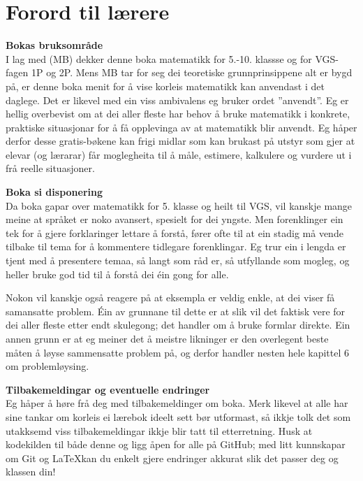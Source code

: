 


\newpage
\section*{Forord til lærere}
\textbf{Bokas bruksområde}\\
I lag med  (MB) dekker denne boka matematikk for 5.-10. klassse og for VGS-fagen 1P og 2P. Mens MB tar for seg dei teoretiske grunnprinsippene alt er bygd på, er denne boka menit for å vise korleis matematikk kan anvendast i det daglege. Det er likevel med ein viss ambivalens eg bruker ordet ''anvendt''. Eg er hellig overbevist om at dei aller fleste har behov å bruke matematikk i konkrete, praktiske situasjonar for å få opplevinga av at matematikk blir anvendt. Eg håper derfor desse gratis-bøkene kan frigi midlar som kan brukast på utstyr som gjer at elevar (og lærarar) får moglegheita til å måle, estimere, kalkulere og vurdere ut i frå reelle situasjoner.\vsk

\textbf{Boka si disponering} \\
Da boka gapar over matematikk for 5. klasse og heilt til VGS, vil kanskje mange meine at språket er noko avansert, spesielt for dei yngste. Men forenklinger ein tek for å gjere forklaringer lettare å forstå, fører ofte til at ein stadig må vende tilbake til tema for å kommentere tidlegare forenklingar. Eg trur ein i lengda er tjent med å presentere temaa, så langt som råd er, så utfyllande som mogleg, og heller bruke god tid til å forstå dei éin gong for alle.\vsk

Nokon vil kanskje også reagere på at eksempla er veldig enkle, at dei viser få samansatte problem. Éin av grunnane til dette er at slik vil det faktisk vere for dei aller fleste etter endt skulegong; det handler om å bruke formlar direkte. Ein annen grunn er at eg meiner det å meistre likninger er den overlegent beste måten å løyse sammensatte problem på, og derfor handler nesten hele kapittel 6 om problemløysing.\vsk


\textbf{Tilbakemeldingar og eventuelle endringer} \\
Eg håper å høre frå deg med tilbakemeldinger om boka. Merk likevel at alle har sine tankar om korleis ei lærebok ideelt sett bør utformast, så ikkje tolk det som utakksemd viss tilbakemeldingar ikkje blir tatt til etterretning. Husk at kodekilden til både denne  og \mb\;ligg åpen for alle på GitHub; med litt kunnskapar om Git og \LaTeX kan du enkelt gjere endringer akkurat slik det passer deg og klassen din!


